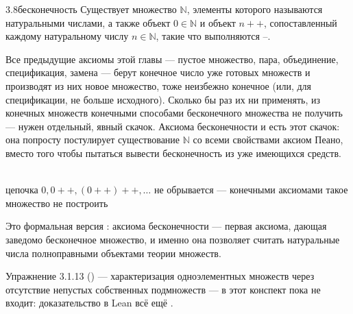 \begin{axiom}{3.8}{бесконечность}
Существует множество $\mathbb{N}$, элементы которого называются натуральными числами, а
также объект $0 \in \mathbb{N}$ и объект $n{+}{+}$, сопоставленный каждому натуральному
числу $n \in \mathbb{N}$, такие что выполняются –.
\end{axiom}

\begin{intuition}
Все предыдущие аксиомы этой главы — пустое множество, пара, объединение, спецификация,
замена — берут конечное число уже готовых множеств и производят из них новое множество,
тоже неизбежно конечное (или, для спецификации, не больше исходного). Сколько бы раз их ни
применять, из конечных множеств конечными способами бесконечного множества не получить —
нужен отдельный, явный скачок. Аксиома бесконечности и есть этот скачок: она попросту
постулирует существование $\mathbb{N}$ со всеми свойствами аксиом Пеано, вместо того чтобы
пытаться вывести бесконечность из уже имеющихся средств.

\begin{center}
\\
{\footnotesize\color{intuitiongray}цепочка $0,0{+}{+},(0{+}{+}){+}{+},\ldots$ не обрывается
— конечными аксиомами такое множество не построить}
\end{center}
\end{intuition}

\begin{remark}
Это формальная версия : аксиома бесконечности —
первая аксиома, дающая заведомо бесконечное множество, и именно она позволяет считать
натуральные числа полноправными объектами теории множеств.
\end{remark}

\begin{remark}
Упражнение 3.1.13 () — характеризация одноэлементных множеств через
отсутствие непустых собственных подмножеств — в этот конспект пока не входит: доказательство
в Lean всё ещё .
\end{remark}
